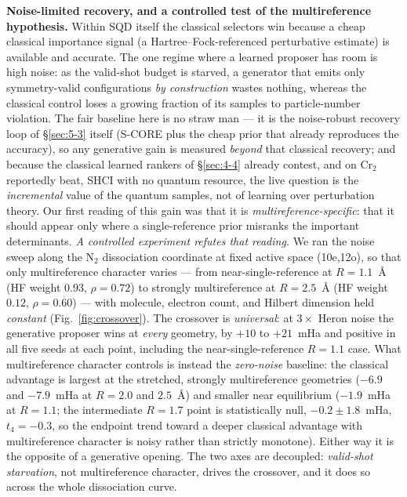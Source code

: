 \documentclass[11pt]{article}
\begin{document}
\textbf{Noise-limited recovery, and a controlled test of the multireference hypothesis.} Within SQD itself the classical selectors win because a cheap classical importance signal (a Hartree--Fock-referenced perturbative estimate) is available and accurate. The one regime where a learned proposer has room is high noise: as the valid-shot budget is starved, a generator that emits only symmetry-valid configurations \emph{by construction} wastes nothing, whereas the classical control loses a growing fraction of its samples to particle-number violation. The fair baseline here is no straw man --- it is the noise-robust recovery loop of \S\ref{sec:5-3} itself (S-CORE plus the cheap prior that already reproduces the accuracy), so any generative gain is measured \emph{beyond} that classical recovery; and because the classical learned rankers of \S\ref{sec:4-4} already contest, and on Cr$_2$ reportedly beat, SHCI with no quantum resource, the live question is the \emph{incremental} value of the quantum samples, not of learning over perturbation theory. Our first reading of this gain was that it is \emph{multireference-specific}: that it should appear only where a single-reference prior misranks the important determinants. \emph{A controlled experiment refutes that reading.} We ran the noise sweep along the N$_2$ dissociation coordinate at fixed active space (10e,12o), so that only multireference character varies --- from near-single-reference at $R{=}1.1$~\AA{} (HF weight $0.93$, $\rho{=}0.72$) to strongly multireference at $R{=}2.5$~\AA{} (HF weight $0.12$, $\rho{=}0.60$) --- with molecule, electron count, and Hilbert dimension held \emph{constant} (Fig.~\ref{fig:crossover}). The crossover is \emph{universal}: at $3\times$ Heron noise the generative proposer wins at \emph{every} geometry, by $+10$ to $+21$~mHa and positive in all five seeds at each point, including the near-single-reference $R{=}1.1$ case. What multireference character controls is instead the \emph{zero-noise} baseline: the classical advantage is largest at the stretched, strongly multireference geometries ($-6.9$ and $-7.9$~mHa at $R{=}2.0$ and $2.5$~\AA) and smaller near equilibrium ($-1.9$~mHa at $R{=}1.1$; the intermediate $R{=}1.7$ point is statistically null, $-0.2\pm1.8$~mHa, $t_4{=}-0.3$, so the endpoint trend toward a deeper classical advantage with multireference character is noisy rather than strictly monotone). Either way it is the opposite of a generative opening. The two axes are decoupled: \emph{valid-shot starvation}, not multireference character, drives the crossover, and it does so across the whole dissociation curve.
\end{document}
